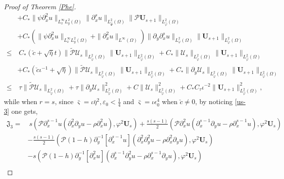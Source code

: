 \documentclass{amsart}
\numberwithin{equation}{section}
\begin{document}
\begin{proof}[Proof of Theorem \ref{Phe}]
\begin{align*}
    &+C_{*}\|\psi\partial_{x}^{2}u\|_{L_{x}^{\infty}L_{y}^{2}(\Omega)}\|\partial_{x}^{s}u\|_{L_{\hat{\Psi}}^{2}(\Omega)}
           \|\mathcal{P}\mathbf{U}_{s+1}\|_{L_{\hat{\varphi}}^{2}(\Omega)}\nonumber\\
    &+C_{*}\left(\|\psi\partial_{x}^{2}u\|_{L_{x}^{\infty}L_{y}^{2}(\Omega)}+\|\partial_{x}^{2}u\|_{L^{\infty}(\Omega)}\right)
           \|\partial_{y}\partial_{x}^{s}u\|_{L_{\varphi}^{2}(\Omega)}\|\mathbf{U}_{s+1}\|_{L_{\check{\varphi}}^{2}(\Omega)}\\
\leq&~C_{*}(\check{c}+\sqrt{\bar{\eta}}t)\|\tilde{\mathcal{P}}\mathcal{U}_{s}\|_{L_{\tilde{\varphi}}^{2}(\Omega)}
                                             \|\mathbf{U}_{s+1}\|_{L_{\hat{\varphi}}^{2}(\Omega)}
     +C_{*}\|\mathcal{U}_{s}\|_{L_{\tilde{\varphi}}^{2}(\Omega)}\|\mathbf{U}_{s+1}\|_{L_{\hat{\varphi}}^{2}(\Omega)}\nonumber\\
    &+C_{*}(\check{c}\iota^{-1}+\sqrt{\bar{\eta}})\|\tilde{\mathcal{P}}\mathcal{U}_{s}\|_{L_{\tilde{\varphi}}^{2}(\Omega)}
                                                  \|\mathbf{U}_{s+1}\|_{L_{\hat{\varphi}}^{2}(\Omega)}
     +C_{*}\|\partial_{y}\mathcal{U}_{s}\|_{L_{\tilde{\varphi}}^{2}(\Omega)}\|\mathbf{U}_{s+1}\|_{L_{\hat{\varphi}}^{2}(\Omega)}\nonumber\\
\leq&~\tau\|\tilde{\mathcal{P}}\mathcal{U}_{s}\|_{L_{\tilde{\varphi}}^{2}(\Omega)}
     +\tau\|\partial_{y}\mathcal{U}_{s}\|_{L_{\tilde{\varphi}}^{2}(\Omega)}^{2}
     +C\|\mathcal{U}_{s}\|_{L_{\tilde{\varphi}}^{2}(\Omega)}^{2}
     +C_{*}C_{\tau}\iota^{-2}\|\mathbf{U}_{s+1}\|_{L_{\hat{\varphi}}^{2}(\Omega)}^{2},\nonumber
\end{align*}
while when $r=s$, since $\bar{\varsigma}=\iota\bar{\eta}^{2},\varepsilon_{0}<\frac{1}{4}$ and $\bar{\varsigma}=\iota\epsilon_{0}^{4}$ when $\check{c}\neq 0$, by noticing \eqref{us-3} one gets,
\begin{align*}
\mathfrak{J}_{3}
=&~s(\mathcal{P}\partial_{x}^{s-1}u(\partial_{x}^{2}\partial_{y}u-\rho\partial_{x}^{2}u),\varphi^{2}\mathbf{U}_{s})
  +\frac{s(s-1)}{2}(\mathcal{P}\partial_{x}^{2}u(\partial_{x}^{s-1}\partial_{y}u-\rho\partial_{x}^{s-1}u),\varphi^{2}\mathbf{U}_{s})\\
 &-\frac{s(s-1)}{2}(\mathcal{P}(1-h)\partial_{y}^{-1}[\partial_{x}^{s-1}u](\partial_{x}^{2}\partial_{y}^{2}u-\rho\partial_{x}^{2}\partial_{y}u),\varphi^{2}\mathbf{U}_{s})\\
 &-s(\mathcal{P}(1-h)\partial_{y}^{-1}[\partial_{x}^{2}u](\partial_{x}^{s-1}\partial_{y}^{2}u-\rho\partial_{x}^{s-1}\partial_{y}u),\varphi^{2}\mathbf{U}_{s})\nonumber\\

\end{align*}
\end{proof}
\end{document}
